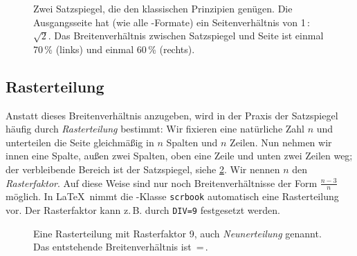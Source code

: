 \begin{figure}
  \centering
  \quad
  \caption{Zwei Satzspiegel, die den klassischen Prinzipien genügen. Die
    Ausgangsseite hat (wie alle -Formate) ein Seitenverhältnis von
    1\,:\,$\sqrt{\text{2}}$. Das Breitenverhältnis zwischen Satzspiegel und Seite ist
    einmal 70\,\% (links) und einmal 60\,\% (rechts).}
  \label{fig:Satzspiegel}
\end{figure}

\subsection{Rasterteilung}

Anstatt dieses Breitenverhältnis anzugeben, wird in der Praxis der Satzspiegel
häufig durch \emph{Rasterteilung} bestimmt: Wir fixieren eine natürliche Zahl
$n$ und unterteilen die Seite gleichmäßig in $n$ Spalten und $n$ Zeilen. Nun
nehmen wir innen eine Spalte, außen zwei Spalten, oben eine Zeile und unten zwei
Zeilen weg; der verbleibende Bereich ist der Satzspiegel, siehe
\cref{fig:DIV}. Wir nennen $n$ den \emph{Rasterfaktor}. Auf diese
Weise sind nur noch Breitenverhältnisse der Form $\frac{n-3}{n}$ möglich. In
\LaTeX\ nimmt die -Klasse \verb!scrbook! automatisch eine
Rasterteilung vor. Der Rasterfaktor kann z.\,B. durch \verb!DIV=9!
festgesetzt werden.

\begin{figure}
  \centering
  \caption{Eine Rasterteilung mit Rasterfaktor 9, auch
    \emph{Neunerteilung} genannt. Das entstehende Breitenverhältnis ist
    \,=\,.}
  \label{fig:DIV}
\end{figure}


